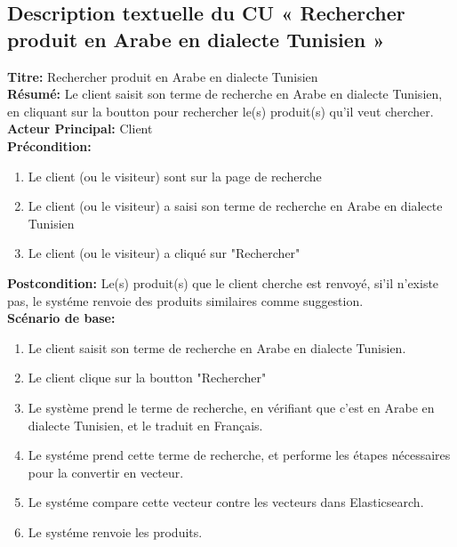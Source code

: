 \subsection{Description textuelle du CU « Rechercher produit en Arabe en dialecte Tunisien »}
\noindent
\textbf{Titre:} Rechercher produit en Arabe en dialecte Tunisien \\
\textbf{Résumé:} Le client saisit son terme de recherche en Arabe en dialecte Tunisien, en cliquant sur la boutton pour rechercher le(s) produit(s) qu'il veut chercher. \\
\textbf{Acteur Principal:} Client \\
\textbf{Précondition:} \begin{enumerate}
	\item Le client (ou le visiteur) sont sur la page de recherche
	\item Le client (ou le visiteur) a saisi son terme de recherche en Arabe en dialecte Tunisien
	\item Le client (ou le visiteur) a cliqué sur "Rechercher"
\end{enumerate}
\textbf{Postcondition:} Le(s) produit(s) que le client cherche est renvoyé, si'il n'existe pas, le systéme renvoie des produits similaires comme suggestion. \\
\textbf{Scénario de base: }
\begin{enumerate}
	\item Le client saisit son terme de recherche en Arabe en dialecte Tunisien.
	\item Le client clique sur la boutton "Rechercher"
	\item Le système prend le terme de recherche, en vérifiant que c'est en Arabe en dialecte Tunisien, et le traduit en Français.
	\item Le systéme prend cette terme de recherche, et performe les étapes nécessaires pour la convertir en vecteur.
	\item Le systéme compare cette vecteur contre les vecteurs dans Elasticsearch.
	\item Le systéme renvoie les produits.
\end{enumerate}

